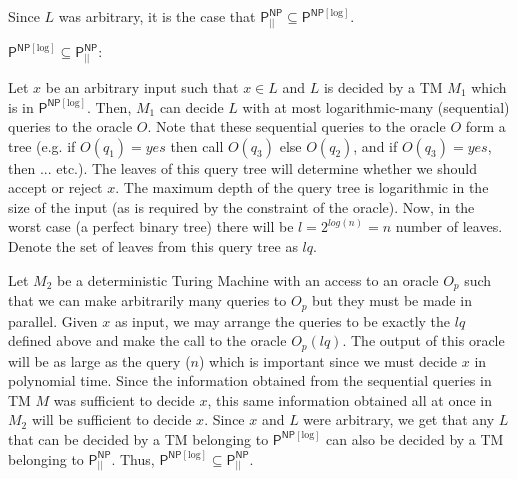 \begin{question}
\begin{answer}
    Since $L$ was arbitrary, it is the case that $\mathsf{P}_{||}^{\mathsf{NP}} \subseteq \mathsf{P}^{\mathsf{NP}[\text{log}]}$.

    \vspace{1em}

    $\mathsf{P}^{\mathsf{NP}[\text{log}]} \subseteq   \mathsf{P}_{||}^{\mathsf{NP}}:$

    \par Let $x$ be an arbitrary input such that $x \in L$ and $L$ is decided by a TM $M_1$ which is in $\mathsf{P}^{\mathsf{NP}[\text{log}]}$. Then, $M_1$ can decide $L$ with at most logarithmic-many (sequential) queries to the oracle $O$. Note that these sequential queries to the oracle $O$ form a tree (e.g. if $O(q_1) = yes$ then call $O(q_3)$ else $O(q_2)$, and if $O(q_3) = yes$, then ... etc.). The leaves of this query tree will determine whether we should accept or reject $x$. The maximum depth of the query tree is logarithmic in the size of the input (as is required by the constraint of the oracle). Now, in the worst case (a perfect binary tree) there will be $l = 2^{log(n)} = n$ number of leaves. Denote the set of leaves from this query tree as $lq$.
    \par Let $M_2$ be a deterministic Turing Machine with an access to an oracle $O_p$ such that we can make arbitrarily many queries to $O_p$ but they must be made in parallel. Given $x$ as input, we may arrange the queries to be exactly the $lq$ defined above and make the call to the oracle $O_p(lq)$. The output of this oracle will be as large as the query ($n$) which is important since we must decide $x$ in polynomial time. Since the information obtained from the sequential queries in TM $M$ was sufficient to decide $x$, this same information obtained all at once in $M_2$ will be sufficient to decide $x$. Since $x$ and $L$ were arbitrary, we get that any $L$ that can be decided by a TM belonging to $\mathsf{P}^{\mathsf{NP}[\text{log}]}$ can also be decided by a TM belonging to $\mathsf{P}_{||}^{\mathsf{NP}}$. Thus, $\mathsf{P}^{\mathsf{NP}[\text{log}]} \subseteq   \mathsf{P}_{||}^{\mathsf{NP}}$.
\end{answer}
\end{question}
